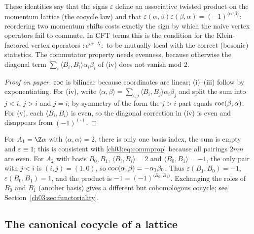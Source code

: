 \begin{physics}
These identities say that the signs $\varepsilon$ define an associative twisted product on the momentum lattice (the cocycle law) and that $\varepsilon(\alpha,\beta)\varepsilon(\beta,\alpha)=(-1)^{\langle\alpha,\beta\rangle}$: reordering two momentum shifts costs exactly the sign by which the naive vertex operators fail to commute. In CFT terms this is the condition for the Klein-factored vertex operators $:\!e^{i\alpha\cdot X}\!:$ to be mutually local with the correct (bosonic) statistics. The commutator property needs evenness, because otherwise the diagonal term $\sum_i\langle B_i,B_i\rangle\alpha_i\beta_i$ of (iv) does not vanish mod $2$.
\end{physics}

\begin{proof}[Proof on paper]
$\operatorname{coc}$ is bilinear because coordinates are linear; (i)--(iii) follow by exponentiating.
For (iv), write $\langle\alpha,\beta\rangle=\sum_{i,j}\langle B_i,B_j\rangle\alpha_i\beta_j$ and
split the sum into $j<i$, $j>i$ and $j=i$; by symmetry of the form the $j>i$ part equals
$\operatorname{coc}(\beta,\alpha)$. For (v), each $\langle B_i,B_i\rangle$ is even, so the diagonal
correction in (iv) is even and disappears from $(-1)^{(\cdot)}$.
\end{proof}

\begin{example}[$A_1$ and $A_2$]\label{ch03:ex:A1A2}
For $A_1=\Z\alpha$ with $\langle\alpha,\alpha\rangle=2$, there is only one basis index, the sum is
empty and $\varepsilon\equiv1$; this is consistent with \eqref{ch03:eq:commprop} because all
pairings $2mn$ are even. For $A_2$ with basis $B_0,B_1$, $\langle B_i,B_i\rangle=2$ and
$\langle B_0,B_1\rangle=-1$, the only pair with $j<i$ is $(i,j)=(1,0)$, so
$\operatorname{coc}(\alpha,\beta)=-\alpha_1\beta_0$. Thus $\varepsilon(B_1,B_0)=-1$,
$\varepsilon(B_0,B_1)=1$, and the product is $-1=(-1)^{\langle B_0,B_1\rangle}$. Exchanging the
roles of $B_0$ and $B_1$ (another basis) gives a different but cohomologous cocycle; see
Section~\ref{ch03:sec:functoriality}.
\end{example}

\subsection{The canonical cocycle of a lattice}

